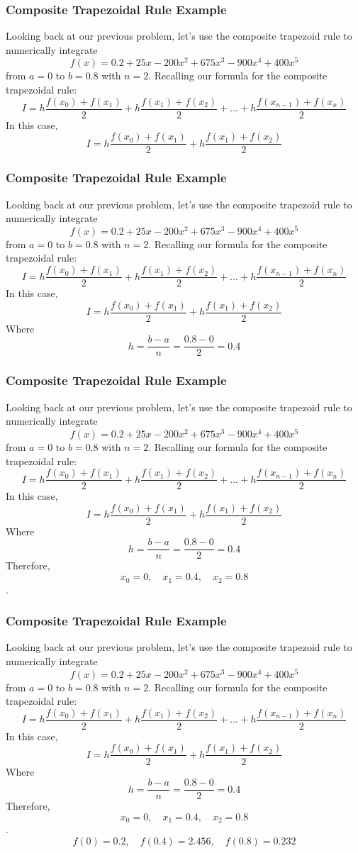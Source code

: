 \documentclass{if-beamer}
\begin{document}
\begin{frame}
	\frametitle{Composite Trapezoidal Rule Example}
	Looking back at our previous problem, let's use the composite trapezoid rule to numerically integrate
	$$f(x) =0.2+25x-200x^2+675x^3-900x^4+400x^5$$
	from $a = 0$ to $b=0.8$ with $n = 2$. Recalling our formula for the composite trapezoidal rule:
	$$I = h\frac{f(x_0)+f(x_1)}{2}+h\frac{f(x_1)+f(x_2)}{2}+...+h\frac{f(x_{n-1})+f(x_n)}{2}$$
	In this case, 
	$$I = h\frac{f(x_0)+f(x_1)}{2}+h\frac{f(x_1)+f(x_2)}{2}$$
\end{frame}

\begin{frame}
	\frametitle{Composite Trapezoidal Rule Example}
	Looking back at our previous problem, let's use the composite trapezoid rule to numerically integrate
	$$f(x) =0.2+25x-200x^2+675x^3-900x^4+400x^5$$
	from $a = 0$ to $b=0.8$ with $n = 2$. Recalling our formula for the composite trapezoidal rule:
	$$I = h\frac{f(x_0)+f(x_1)}{2}+h\frac{f(x_1)+f(x_2)}{2}+...+h\frac{f(x_{n-1})+f(x_n)}{2}$$
	In this case, 
	$$I = h\frac{f(x_0)+f(x_1)}{2}+h\frac{f(x_1)+f(x_2)}{2}$$
	Where 
	$$h = \frac{b-a}{n} = \frac{0.8-0}{2} = 0.4$$
\end{frame}

\begin{frame}
	\frametitle{Composite Trapezoidal Rule Example}
	Looking back at our previous problem, let's use the composite trapezoid rule to numerically integrate
	$$f(x) =0.2+25x-200x^2+675x^3-900x^4+400x^5$$
	from $a = 0$ to $b=0.8$ with $n = 2$. Recalling our formula for the composite trapezoidal rule:
	$$I = h\frac{f(x_0)+f(x_1)}{2}+h\frac{f(x_1)+f(x_2)}{2}+...+h\frac{f(x_{n-1})+f(x_n)}{2}$$
	In this case, 
	$$I = h\frac{f(x_0)+f(x_1)}{2}+h\frac{f(x_1)+f(x_2)}{2}$$
	Where 
	$$h = \frac{b-a}{n} = \frac{0.8-0}{2} = 0.4$$
	Therefore,
	$$ x_0 = 0, \quad x_1 = 0.4, \quad x_2 = 0.8$$.
\end{frame}

\begin{frame}
	\frametitle{Composite Trapezoidal Rule Example}
	Looking back at our previous problem, let's use the composite trapezoid rule to numerically integrate
	$$f(x) =0.2+25x-200x^2+675x^3-900x^4+400x^5$$
	from $a = 0$ to $b=0.8$ with $n = 2$. Recalling our formula for the composite trapezoidal rule:
	$$I = h\frac{f(x_0)+f(x_1)}{2}+h\frac{f(x_1)+f(x_2)}{2}+...+h\frac{f(x_{n-1})+f(x_n)}{2}$$
	In this case, 
	$$I = h\frac{f(x_0)+f(x_1)}{2}+h\frac{f(x_1)+f(x_2)}{2}$$
	Where 
	$$h = \frac{b-a}{n} = \frac{0.8-0}{2} = 0.4$$
	Therefore,
	$$ x_0 = 0, \quad x_1 = 0.4, \quad x_2 = 0.8$$.
	$$f(0) = 0.2, \quad f(0.4) = 2.456, \quad f(0.8) = 0.232$$
\end{frame}
\end{document}

